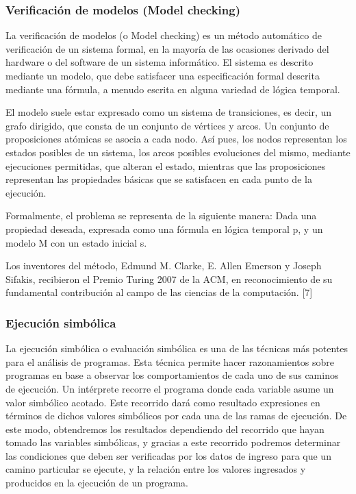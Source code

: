 \subsubsection*{Verificaci\'on de modelos (Model checking)}

La verificaci\'on de modelos (o Model checking) es un m\'etodo autom\'atico de verificaci\'on de un sistema formal, en la mayor\'ia de las ocasiones derivado del hardware o del software de un sistema inform\'atico. El sistema es descrito mediante un modelo, que debe satisfacer una especificaci\'on formal descrita mediante una f\'ormula, a menudo escrita en alguna variedad de l\'ogica temporal.

El modelo suele estar expresado como un sistema de transiciones, es decir, un grafo dirigido, que consta de un conjunto de v\'ertices y arcos. Un conjunto de proposiciones at\'omicas se asocia a cada nodo. As\'i pues, los nodos representan los estados posibles de un sistema, los arcos posibles evoluciones del mismo, mediante ejecuciones permitidas, que alteran el estado, mientras que las proposiciones representan las propiedades b\'asicas que se satisfacen en cada punto de la ejecuci\'on.

Formalmente, el problema se representa de la siguiente manera: Dada una propiedad deseada, expresada como una f\'ormula en l\'ogica temporal p, y un modelo M con un estado inicial s.

Los inventores del m\'etodo, Edmund M. Clarke, E. Allen Emerson y Joseph Sifakis, recibieron el Premio Turing 2007 de la ACM, en reconocimiento de su fundamental contribuci\'on al campo de las ciencias de la computaci\'on. [7]

\subsubsection*{Ejecuci\'on simb\'olica}

La ejecuci\'on simb\'olica o evaluaci\'on simb\'olica es una de las t\'ecnicas  m\'as potentes para el an\'alisis de programas. Esta t\'ecnica permite hacer razonamientos sobre programas en base a observar los comportamientos de cada uno de sus caminos de ejecuci\'on. Un int\'erprete recorre el programa donde cada variable asume un valor simb\'olico acotado. Este recorrido dar\'a como resultado expresiones en t\'erminos de dichos valores simb\'olicos por cada una de las ramas de ejecuci\'on. De este modo, obtendremos los resultados dependiendo del recorrido que hayan tomado las variables simb\'olicas, y gracias a este recorrido podremos determinar las condiciones que deben ser verificadas por los datos de ingreso para que un camino particular se ejecute, y la relaci\'on entre los valores ingresados y producidos en la ejecuci\'on de un programa.

